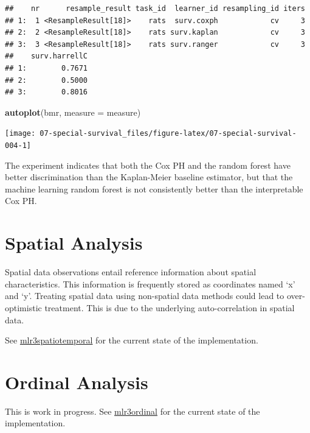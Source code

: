 \documentclass[]{scrbook}
\newenvironment{Shaded}{\begin{snugshade}}{\end{snugshade}}
\newcommand{\DataTypeTok}[1]{\textcolor[rgb]{0.13,0.29,0.53}{#1}}
\newcommand{\KeywordTok}[1]{\textcolor[rgb]{0.13,0.29,0.53}{\textbf{#1}}}
\newcommand{\NormalTok}[1]{#1}
\renewenvironment{Shaded} {\begin{snugshade}\small} {\end{snugshade}}
\begin{document}
\begin{verbatim}
##    nr      resample_result task_id  learner_id resampling_id iters
## 1:  1 <ResampleResult[18]>    rats  surv.coxph            cv     3
## 2:  2 <ResampleResult[18]>    rats surv.kaplan            cv     3
## 3:  3 <ResampleResult[18]>    rats surv.ranger            cv     3
##    surv.harrellC
## 1:        0.7671
## 2:        0.5000
## 3:        0.8016
\end{verbatim}

\begin{Shaded}
\begin{Highlighting}[]
\KeywordTok{autoplot}\NormalTok{(bmr, }\DataTypeTok{measure =}\NormalTok{ measure)}
\end{Highlighting}
\end{Shaded}

\begin{center}\texttt{[image: 07-special-survival\_files/figure-latex/07-special-survival-004-1]} \end{center}

The experiment indicates that both the Cox PH and the random forest have better discrimination than the Kaplan-Meier baseline estimator, but that the machine learning random forest is not consistently better than the interpretable Cox PH.

\hypertarget{spatial}{%
\section{Spatial Analysis}\label{spatial}}

Spatial data observations entail reference information about spatial characteristics.
This information is frequently stored as coordinates named `x' and `y'.
Treating spatial data using non-spatial data methods could lead to over-optimistic treatment.
This is due to the underlying auto-correlation in spatial data.

See \href{https://github.com/mlr-org/mlr3spatiotemporal}{mlr3spatiotemporal} for the current state of the implementation.

\hypertarget{ordinal}{%
\section{Ordinal Analysis}\label{ordinal}}

This is work in progress.
See \href{https://github.com/mlr-org/mlr3ordinal}{mlr3ordinal} for the current state of the implementation.
\end{document}

